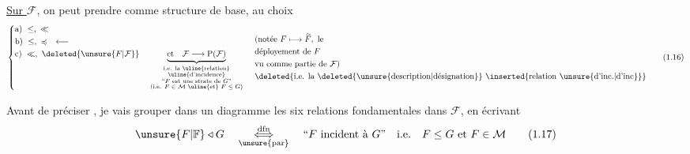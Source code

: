 \uline{Sur $\mathcal{F}$}, on peut prendre comme structure de base, au choix
\[
\left\{\begin{aligned}
 &\text{a)}\ \leq,\ \ll\\
 &\text{b)}\ \leq,\ \preccurlyeq \quad \longleftarrow\\
 &\text{c)}\ \ll,\ \deleted{\unsure{F|\mathcal{F}}}\quad
 \underbrace{\text{et}\quad\mathcal{F}\longrightarrow\mathrm{P}(\mathcal{F})}_{
 \begin{smallmatrix}
 \text{i.e. la \uline{relation}}\\[-1pt]
 \text{\uline{d'incidence}}\\
 \text{``$F$ est une strate de $G$''}\\
 \text{(i.e. $F\in\mathcal{M}$ \uline{et} $F\leq G$)}
 \end{smallmatrix}}
\end{aligned}\right.
\quad
\begin{aligned}
 &\text{(notée }F\longmapsto\widetilde F,\ \text{le}\\
 &\text{déployement de }F\\
 &\text{vu comme partie de }\mathcal{F}\text{)}\\
 &\text{\deleted{i.e. la \deleted{\unsure{description|désignation}} \inserted{relation \unsure{d'inc.|d'inc}}}}
\end{aligned}
\tag*{(1.16)}
\]

 Avant de préciser , je vais grouper dans un diagramme les six relations fondamentales dans $\mathcal{F}$, en écrivant
\[
\unsure{F|\mathbb{F}}\triangleleft G\quad
\underset{\unsure{\mathrm{par}}}{\overset{\mathrm{dfn}}{\Longleftrightarrow}}\quad
\text{``$F$ incident à $G$''}\quad\text{i.e.}\quad F\leq G\ \text{et}\ F\in\mathcal{M}
\tag*{(1.17)}
\]

